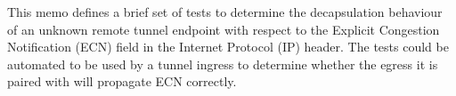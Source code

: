 
This memo defines a brief set of tests to determine the decapsulation behaviour of an unknown remote tunnel endpoint with respect to the Explicit Congestion Notification (ECN) field in the Internet Protocol (IP) header. The tests could be automated to be used by a tunnel ingress to determine whether the egress it is paired with will propagate ECN correctly.


